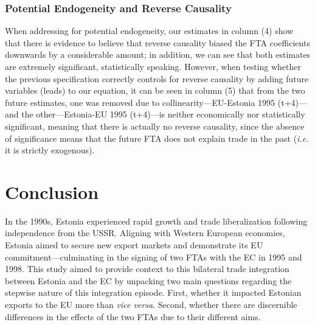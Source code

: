 \documentclass[a4paper,10pt]{article}
\begin{document}
\subsubsection{Potential Endogeneity and Reverse Causality} \label{results_fta_endogeneity}

When addressing for potential endogeneity, our estimates in column (4) show that there is evidence to believe that reverse causality biased the FTA coefficients downwards by a considerable amount; in addition, we can see that both estimates are extremely significant, statistically speaking. However, when testing whether the previous specification correctly controls for reverse causality by adding future variables (leads) to our equation, it can be seen in column (5) that from the two future estimates, one was removed due to collinearity---EU-Estonia 1995 (t+4)---and the other---Estonia-EU 1995 (t+4)---is neither economically nor statistically significant, meaning that there is actually no reverse causality, since the absence of significance means that the future FTA does not explain trade in the past (\textit{i.e.} it is strictly exogenous).



\section{Conclusion} \label{conclusion}

In the 1990s, Estonia experienced rapid growth and trade liberalization following independence from the USSR. Aligning with Western European economies, Estonia aimed to secure new export markets and demonstrate its EU commitment---culminating in the signing of two FTAs with the EC in 1995 and 1998. This study aimed to provide context to this bilateral trade integration between Estonia and the EC by unpacking two main questions regarding the stepwise nature of this integration episode. First, whether it impacted Estonian exports to the EU more than \textit{vice versa}. Second, whether there are discernible differences in the effects of the two FTAs due to their different aims.
\end{document}
